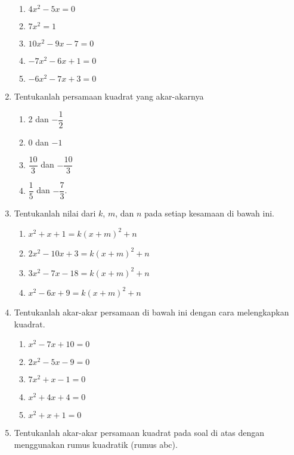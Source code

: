 \begin{enumerate}[topsep=0pt]
\begin{multcols}
\begin{enumerate}
					\item $ 4x^{2} - 5x = 0 $
					\item $ 7x^{2} = 1 $
					\item $ 10x^{2} - 9x - 7 = 0 $
					\item $ -7x^{2} - 6x + 1 = 0 $
					\item $ -6x^{2} - 7x + 3 = 0 $
				\end{enumerate}
			\end{multcols}
			\item Tentukanlah persamaan kuadrat yang akar-akarnya
			\begin{multcols}
				\begin{enumerate}
					\item 2 dan $ -\dfrac{1}{2} $
					\item 0 dan $ -1 $
					\item $ \dfrac{10}{3} $ dan $ -\dfrac{10}{3} $
					\item $ \dfrac{1}{5} $ dan $ -\dfrac{7}{3} $.
				\end{enumerate}
			\end{multcols}
			\item Tentukanlah nilai dari $ k $, $ m $, dan $ n $ pada setiap kesamaan di bawah ini.
			\begin{enumerate}
				\item $ x^{2} + x + 1 = k\left(x + m\right)^{2} + n $
				\item $ 2x^{2} - 10x + 3 = k\left(x + m\right)^{2} + n $
				\item $ 3x^{2} - 7x - 18 = k\left(x + m\right)^{2} + n $
				\item $ x^{2} - 6x + 9 = k\left(x + m\right)^{2} + n $
			\end{enumerate}
			\item Tentukanlah akar-akar persamaan di bawah ini dengan cara melengkapkan kuadrat.
			\begin{multcols}
				\begin{enumerate}
					\item $ x^{2} - 7x + 10 = 0 $
					\item $ 2x^{2} - 5x - 9 = 0 $
					\item $ 7x^{2} + x - 1 = 0 $
					\item $ x^{2} + 4x + 4 = 0 $
					\item $ x^{2} + x + 1 = 0 $
				\end{enumerate}
			\end{multcols}
			\item Tentukanlah akar-akar persamaan kuadrat pada soal di atas dengan menggunakan rumus kuadratik (rumus abc).

\end{enumerate}
